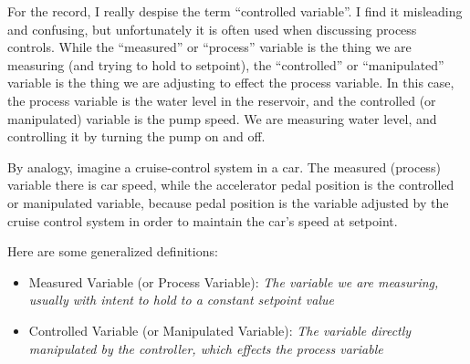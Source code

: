 \vskip 10pt

For the record, I really despise the term ``controlled variable''.  I find it misleading and confusing, but unfortunately it is often used when discussing process controls.  While the ``measured'' or ``process'' variable is the thing we are measuring (and trying to hold to setpoint), the ``controlled'' or ``manipulated'' variable is the thing we are adjusting to effect the process variable.  In this case, the process variable is the water level in the reservoir, and the controlled (or manipulated) variable is the pump speed.  We are measuring water level, and controlling it by turning the pump on and off.

By analogy, imagine a cruise-control system in a car.  The measured (process) variable there is car speed, while the accelerator pedal position is the controlled or manipulated variable, because pedal position is the variable adjusted by the cruise control system in order to maintain the car's speed at setpoint.

Here are some generalized definitions:

\begin{itemize}
\item{} Measured Variable (or Process Variable): {\it The variable we are measuring, usually with intent to hold to a constant setpoint value}
\vskip 5pt
\item{} Controlled Variable (or Manipulated Variable): {\it The variable directly manipulated by the controller, which effects the process variable}
\end{itemize}












